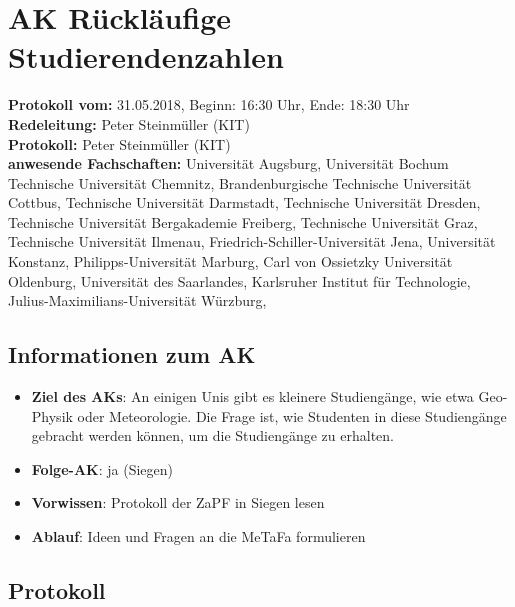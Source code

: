 
\section{AK Rückläufige Studierendenzahlen}

	\textbf{Protokoll vom:} 31.05.2018,
	Beginn: 16:30 Uhr,
	Ende: 18:30 Uhr \\
	\textbf{Redeleitung:} Peter Steinmüller (KIT) \\
	\textbf{Protokoll:} Peter Steinmüller (KIT) \\
	\textbf{anwesende Fachschaften:} Universität Augsburg, Universität Bochum Technische Universität Chemnitz, Brandenburgische Technische Universität Cottbus, Technische Universität Darmstadt, Technische Universität Dresden, Technische Universität Bergakademie Freiberg, Technische Universität Graz, Technische Universität Ilmenau, Friedrich-Schiller-Universität Jena, Universität Konstanz, Philipps-Universität Marburg, Carl von Ossietzky Universität Oldenburg, Universität des Saarlandes, Karlsruher Institut für Technologie, Julius-Maximilians-Universität Würzburg,

	\subsection*{Informationen zum AK}
		\begin{itemize}
			\item \textbf{Ziel des AKs}: An einigen Unis gibt es kleinere Studiengänge, wie etwa Geo-Physik oder Meteorologie. Die Frage ist, wie Studenten in diese Studiengänge gebracht werden können, um die Studiengänge zu erhalten.
			\item \textbf{Folge-AK}: ja (Siegen)
			\item \textbf{Vorwissen}: Protokoll der ZaPF in Siegen lesen
			\item \textbf{Ablauf}: Ideen und Fragen an die MeTaFa formulieren
		\end{itemize}

  \subsection*{Protokoll}
